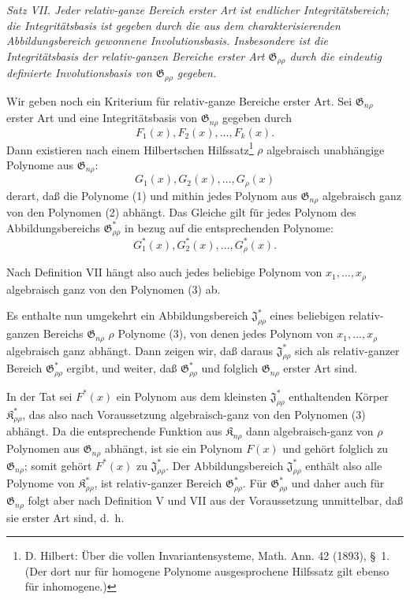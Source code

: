 \documentclass[11pt]{article}
\providecommand{\Kfield}{\mathfrak{K}}
\providecommand{\Jdom}{\mathfrak{J}}
\providecommand{\Gdom}{\mathfrak{G}}
\begin{document}
\emph{Satz VII. Jeder relativ-ganze Bereich erster Art ist endlicher Integritätsbereich; die Integritätsbasis ist gegeben durch die aus dem charakterisierenden Abbildungsbereich gewonnene Involutionsbasis. Insbesondere ist die Integritätsbasis der relativ-ganzen Bereiche erster Art $\Gdom_{\rho\rho}$ durch die eindeutig definierte Involutionsbasis von $\Gdom_{\rho\rho}$ gegeben.}

Wir geben noch ein Kriterium für relativ-ganze Bereiche erster Art. Sei $\Gdom_{n\rho}$ erster Art und eine Integritätsbasis von $\Gdom_{n\rho}$ gegeben durch
\begin{equation}
  F_1(x),F_2(x),\ldots,F_k(x).
\tag{1}
\end{equation}
Dann existieren nach einem Hilbertschen Hilfssatz\footnote{D. Hilbert: Über die vollen Invariantensysteme, Math. Ann. 42 (1893), \S\ 1. (Der dort nur für homogene Polynome ausgesprochene Hilfssatz gilt ebenso für inhomogene.)} $\rho$ algebraisch unabhängige Polynome aus $\Gdom_{n\rho}$:
\begin{equation}
  G_1(x),G_2(x),\ldots,G_\rho(x)
\tag{2}
\end{equation}
derart, daß die Polynome (1) und mithin jedes Polynom aus $\Gdom_{n\rho}$ algebraisch ganz von den Polynomen (2) abhängt. Das Gleiche gilt für jedes Polynom des Abbildungsbereichs $\Gdom^*_{\rho\rho}$ in bezug auf die entsprechenden Polynome:
\begin{equation}
  G_1^*(x),G_2^*(x),\ldots,G_\rho^*(x).
\tag{3}
\end{equation}

Nach Definition VII hängt also auch jedes beliebige Polynom von $x_1,
\ldots,x_\rho$ algebraisch ganz von den Polynomen (3) ab.

Es enthalte nun umgekehrt ein Abbildungsbereich $\Jdom^*_{\rho\rho}$ eines beliebigen relativ-ganzen Bereichs $\Gdom_{n\rho}$ $\rho$ Polynome (3), von denen jedes Polynom von $x_1,
\ldots,x_\rho$ algebraisch ganz abhängt. Dann zeigen wir, daß daraus $\Jdom^*_{\rho\rho}$ sich als relativ-ganzer Bereich $\Gdom^*_{\rho\rho}$ ergibt, und weiter, daß $\Gdom^*_{\rho\rho}$ und folglich $\Gdom_{n\rho}$ erster Art sind.

In der Tat sei $F^*(x)$ ein Polynom aus dem kleinsten $\Jdom^*_{\rho\rho}$ enthaltenden Körper $\Kfield^*_{\rho\rho}$, das also nach Voraussetzung algebraisch-ganz von den Polynomen (3) abhängt. Da die entsprechende Funktion aus $\Kfield_{n\rho}$ dann algebraisch-ganz von $\rho$ Polynomen aus $\Gdom_{n\rho}$ abhängt, ist sie ein Polynom $F(x)$ und gehört folglich zu $\Gdom_{n\rho}$; somit gehört $F^*(x)$ zu $\Jdom^*_{\rho\rho}$. Der Abbildungsbereich $\Jdom^*_{\rho\rho}$ enthält also alle Polynome von $\Kfield^*_{\rho\rho}$, ist relativ-ganzer Bereich $\Gdom^*_{\rho\rho}$. Für $\Gdom^*_{\rho\rho}$ und daher auch für $\Gdom_{n\rho}$ folgt aber nach Definition V und VII aus der Voraussetzung unmittelbar, daß sie erster Art sind, d.~h.
\end{document}
